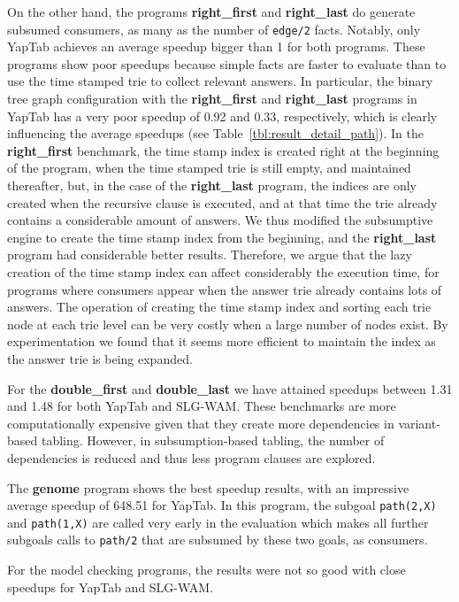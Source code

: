 On the other hand, the programs \textbf{right\_first} and \textbf{right\_last} do generate subsumed consumers,
as many as the number of \texttt{edge/2} facts. Notably, only YapTab
achieves an average speedup bigger than 1 for both programs. These programs show poor speedups because simple facts
are faster to evaluate than to use the time stamped trie to collect relevant answers.
In particular, the binary tree graph configuration with the \textbf{right\_first} and \textbf{right\_last} programs
in YapTab has a very poor speedup of 0.92 and 0.33, respectively, which is clearly influencing the average speedups
(see Table~\ref{tbl:result_detail_path}).
In the \textbf{right\_first} benchmark, the time stamp index is created right at
the beginning of the program, when the time stamped trie is still empty, and maintained thereafter, but,
in the case of the \textbf{right\_last} program, the indices are only created when the recursive
clause is executed, and at that time the trie already contains a considerable amount of answers.
We thus modified the subsumptive
engine to create the time stamp index from the beginning, and the \textbf{right\_last} program had considerable
better results. Therefore, we argue that the lazy creation of the time stamp index can affect considerably the
execution time, for programs where consumers appear when the answer trie already contains lots of answers.
The operation of creating the time stamp index
and sorting each trie node at each trie level can be very costly when a large number of nodes exist.
By experimentation we found that it seems more efficient to maintain the index as the answer trie is being expanded.

For the \textbf{double\_first} and \textbf{double\_last} we have attained speedups between 1.31 and 1.48
for both YapTab and SLG-WAM. These benchmarks are more computationally expensive given that they create more
dependencies in variant-based tabling. However, in subsumption-based tabling, the number of dependencies is reduced 
and thus less program clauses are explored.

The \textbf{genome} program shows the best speedup results, with an impressive average speedup of 
648.51 for YapTab. In this program, the subgoal \texttt{path(2,X)} and \texttt{path(1,X)} are called
very early in the evaluation which makes all further subgoals calls to \texttt{path/2} that are subsumed by these
two goals, as consumers.

For the model checking programs, the results were not so good with close speedups for YapTab and SLG-WAM.


